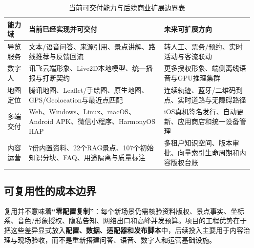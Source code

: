 \begin{table}[H]
  \centering
  \small
  \caption{当前可交付能力与后续商业扩展边界表}\label{tab:commercial-boundary}
  \begin{tabularx}{\textwidth}{p{}p{}X}
    \toprule
    能力域 & 当前已经实现并可交付 & 未来可扩展方向 \\
    \midrule
    导览服务 & 文本/语音问答、来源引用、景点讲解、路线推荐与反馈回流 & 转人工、票务/预约、实时活动与客流联动 \\
    数字人 & 讯飞云端形象、Live2D本地模型、统一播报与打断契约 & 更多授权形象、端侧离线语音与GPU推理集群 \\
    地图定位 & 腾讯地图、Leaflet/手绘图、原生地图、GPS/Geolocation与最近点匹配 & 连续轨迹、蓝牙/二维码到点、实时道路与无障碍路径 \\
    多端交付 & Web、Windows、Linux、macOS、Android APK、微信小程序、HarmonyOS HAP & iOS真机签名发行、自动更新、应用商店和统一设备管理 \\
    内容运营 & 7份内置资料、22个RAG景点、107个初始知识分块、FAQ、用途隔离与质量标注 & 多租户知识空间、版本审批、向量索引生命周期和内容版权台账 \\
    \bottomrule
  \end{tabularx}
\end{table}

\subsection{可复用性的成本边界}

复用并不意味着\textbf{“零配置复制”}：每个新场景仍需核验资料版权、景点事实、坐标系、音色/形象授权、隐私告知、网络出口和高峰并发预算。项目的工程优势在于把这些差异显式放入\textbf{配置、数据、适配器和发布脚本}中，后续投入主要用于内容治理与现场验收，而不是重新搭建问答、语音、数字人和运营基础设施。

